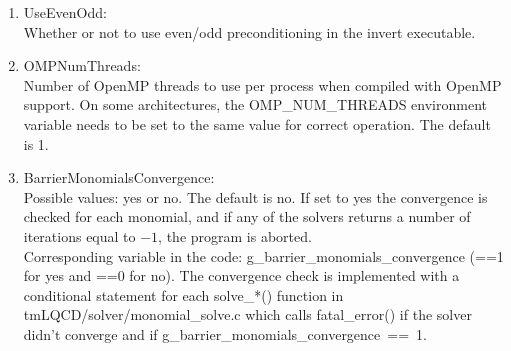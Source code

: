 \begin{enumerate}
\item {\ttfamily UseEvenOdd}:\\
  Whether or not to use even/odd preconditioning in the invert
  executable.

\item {\ttfamily OMPNumThreads}:\\
  Number of OpenMP threads to use per process when compiled with 
  OpenMP support. On some architectures, the {\ttfamily OMP\_NUM\_THREADS}
  environment variable needs to be set to the same value for correct
  operation. The default is 1.
\item  {\ttfamily BarrierMonomialsConvergence}:\\
  Possible values:  {\ttfamily yes} or  {\ttfamily no}. The default is  {\ttfamily no}. 
  If set to  {\ttfamily yes} the convergence is checked for each monomial, 
  and if any of the solvers returns a number of iterations equal to $-1$, 
  the program is aborted.\\
  Corresponding variable in the code: {\ttfamily g\_barrier\_monomials\_convergence} 
  ({\ttfamily==1} for  {\ttfamily yes} 
  and  {\ttfamily ==0} for  {\ttfamily no}).
  The convergence check is implemented with a conditional statement for each {\ttfamily solve\_*()} 
  function in {\ttfamily tmLQCD/solver/monomial\_solve.c} which calls {\ttfamily fatal\_error()} 
  if the solver didn't converge and if \mbox{\ttfamily g\_barrier\_monomials\_convergence \ttfamily == 1}.
\end{enumerate}

